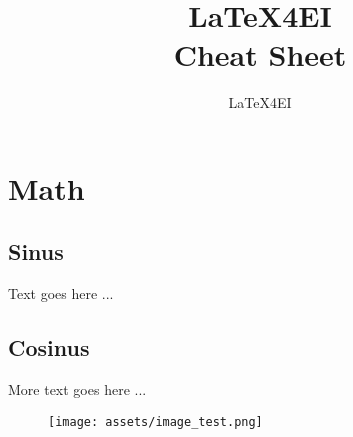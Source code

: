 \documentclass[english]{latex4ei/latex4ei_sheet}
\title{LaTeX4EI \\ Cheat Sheet}
\author{LaTeX4EI}                    %
\begin{document}
\maketitle   %


\section{Math}

\begin{sectionbox}
	\subsection{Sinus}

	Text goes here ...


\end{sectionbox}


\begin{sectionbox}
	\subsection{Cosinus}

	More text goes here ...

\end{sectionbox}

\begin{figure}[H]
	\centering
	\texttt{[image: assets/image\_test.png]}
	\caption{}
	\label{fig:image_test}
\end{figure}


\end{document}
